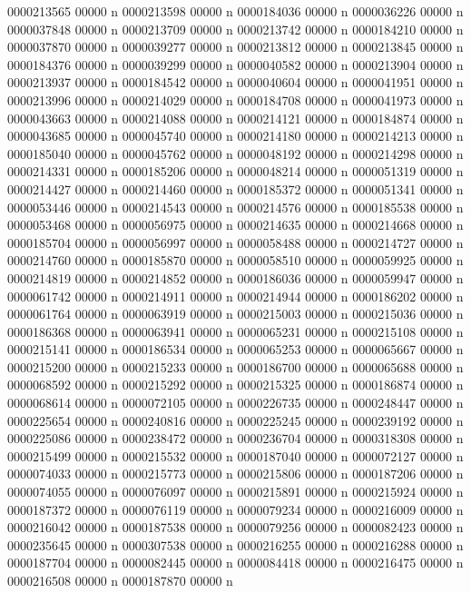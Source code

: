 {{{{{{{0000213565 00000 n 
0000213598 00000 n 
0000184036 00000 n 
0000036226 00000 n 
0000037848 00000 n 
0000213709 00000 n 
0000213742 00000 n 
0000184210 00000 n 
0000037870 00000 n 
0000039277 00000 n 
0000213812 00000 n 
0000213845 00000 n 
0000184376 00000 n 
0000039299 00000 n 
0000040582 00000 n 
0000213904 00000 n 
0000213937 00000 n 
0000184542 00000 n 
0000040604 00000 n 
0000041951 00000 n 
0000213996 00000 n 
0000214029 00000 n 
0000184708 00000 n 
0000041973 00000 n 
0000043663 00000 n 
0000214088 00000 n 
0000214121 00000 n 
0000184874 00000 n 
0000043685 00000 n 
0000045740 00000 n 
0000214180 00000 n 
0000214213 00000 n 
0000185040 00000 n 
0000045762 00000 n 
0000048192 00000 n 
0000214298 00000 n 
0000214331 00000 n 
0000185206 00000 n 
0000048214 00000 n 
0000051319 00000 n 
0000214427 00000 n 
0000214460 00000 n 
0000185372 00000 n 
0000051341 00000 n 
0000053446 00000 n 
0000214543 00000 n 
0000214576 00000 n 
0000185538 00000 n 
0000053468 00000 n 
0000056975 00000 n 
0000214635 00000 n 
0000214668 00000 n 
0000185704 00000 n 
0000056997 00000 n 
0000058488 00000 n 
0000214727 00000 n 
0000214760 00000 n 
0000185870 00000 n 
0000058510 00000 n 
0000059925 00000 n 
0000214819 00000 n 
0000214852 00000 n 
0000186036 00000 n 
0000059947 00000 n 
0000061742 00000 n 
0000214911 00000 n 
0000214944 00000 n 
0000186202 00000 n 
0000061764 00000 n 
0000063919 00000 n 
0000215003 00000 n 
0000215036 00000 n 
0000186368 00000 n 
0000063941 00000 n 
0000065231 00000 n 
0000215108 00000 n 
0000215141 00000 n 
0000186534 00000 n 
0000065253 00000 n 
0000065667 00000 n 
0000215200 00000 n 
0000215233 00000 n 
0000186700 00000 n 
0000065688 00000 n 
0000068592 00000 n 
0000215292 00000 n 
0000215325 00000 n 
0000186874 00000 n 
0000068614 00000 n 
0000072105 00000 n 
0000226735 00000 n 
0000248447 00000 n 
0000225654 00000 n 
0000240816 00000 n 
0000225245 00000 n 
0000239192 00000 n 
0000225086 00000 n 
0000238472 00000 n 
0000236704 00000 n 
0000318308 00000 n 
0000215499 00000 n 
0000215532 00000 n 
0000187040 00000 n 
0000072127 00000 n 
0000074033 00000 n 
0000215773 00000 n 
0000215806 00000 n 
0000187206 00000 n 
0000074055 00000 n 
0000076097 00000 n 
0000215891 00000 n 
0000215924 00000 n 
0000187372 00000 n 
0000076119 00000 n 
0000079234 00000 n 
0000216009 00000 n 
0000216042 00000 n 
0000187538 00000 n 
0000079256 00000 n 
0000082423 00000 n 
0000235645 00000 n 
0000307538 00000 n 
0000216255 00000 n 
0000216288 00000 n 
0000187704 00000 n 
0000082445 00000 n 
0000084418 00000 n 
0000216475 00000 n 
0000216508 00000 n 
0000187870 00000 n 
}}}}}}}

